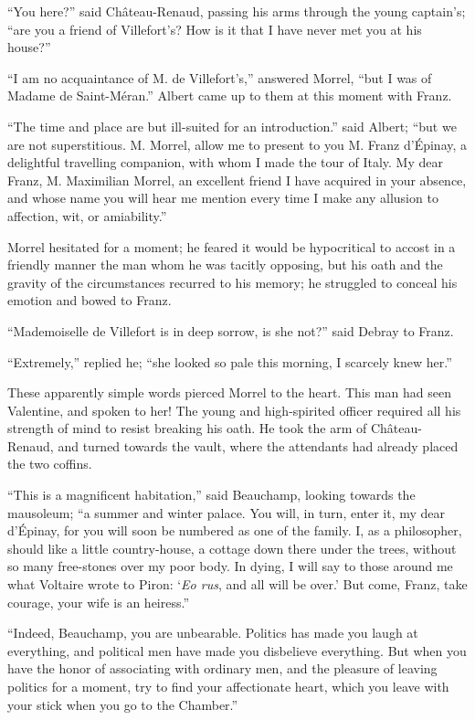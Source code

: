 “You here?” said Château-Renaud, passing his arms through the young
captain’s; “are you a friend of Villefort’s? How is it that I have
never met you at his house?”

“I am no acquaintance of M. de Villefort’s,” answered Morrel, “but I
was of Madame de Saint-Méran.” Albert came up to them at this moment
with Franz.

“The time and place are but ill-suited for an introduction.” said
Albert; “but we are not superstitious. M. Morrel, allow me to present
to you M. Franz d’Épinay, a delightful travelling companion, with whom
I made the tour of Italy. My dear Franz, M. Maximilian Morrel, an
excellent friend I have acquired in your absence, and whose name you
will hear me mention every time I make any allusion to affection, wit,
or amiability.”

Morrel hesitated for a moment; he feared it would be hypocritical to
accost in a friendly manner the man whom he was tacitly opposing, but
his oath and the gravity of the circumstances recurred to his memory;
he struggled to conceal his emotion and bowed to Franz.

“Mademoiselle de Villefort is in deep sorrow, is she not?” said Debray
to Franz.

“Extremely,” replied he; “she looked so pale this morning, I scarcely
knew her.”

These apparently simple words pierced Morrel to the heart. This man had
seen Valentine, and spoken to her! The young and high-spirited officer
required all his strength of mind to resist breaking his oath. He took
the arm of Château-Renaud, and turned towards the vault, where the
attendants had already placed the two coffins.

“This is a magnificent habitation,” said Beauchamp, looking towards the
mausoleum; “a summer and winter palace. You will, in turn, enter it, my
dear d’Épinay, for you will soon be numbered as one of the family. I,
as a philosopher, should like a little country-house, a cottage down
there under the trees, without so many free-stones over my poor body.
In dying, I will say to those around me what Voltaire wrote to Piron:
‘\textit{Eo rus}, and all will be over.’ But come, Franz, take courage, your
wife is an heiress.”

“Indeed, Beauchamp, you are unbearable. Politics has made you laugh at
everything, and political men have made you disbelieve everything. But
when you have the honor of associating with ordinary men, and the
pleasure of leaving politics for a moment, try to find your
affectionate heart, which you leave with your stick when you go to the
Chamber.”

